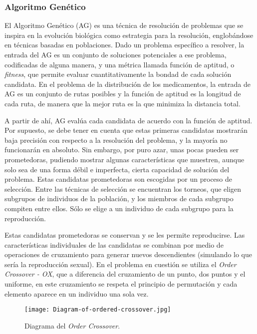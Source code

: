 \documentclass[twocolumn, fontsize=10pt]{article}
\theoremstyle{definition} %
\begin{document}
\subsubsection{Algoritmo Genético}

El Algoritmo Genético (AG) es una técnica de resolución de problemas que se inspira en la evolución biológica como estrategia para la resolución, englobándose en técnicas basadas en poblaciones. Dado un problema específico a resolver, la entrada del AG es un conjunto de soluciones potenciales a ese problema, codificadas de alguna manera, y una métrica llamada función de aptitud, o \textit{fitness}, que permite evaluar cuantitativamente la bondad de cada solución candidata. En el problema de la distribución de los medicamentos, la entrada de AG es un conjunto de rutas posibles y la función de aptitud es la longitud de cada ruta, de manera que la mejor ruta es la que minimiza la distancia total.  

A partir de ahí, AG evalúa cada candidata de acuerdo con la función de aptitud. Por supuesto, se debe tener en cuenta que estas primeras candidatas mostrarán baja precisión con respecto a la resolución del problema, y la mayoría no funcionarán en absoluto. Sin embargo, por puro azar, unas pocas pueden ser prometedoras, pudiendo mostrar algunas características que muestren, aunque solo sea de una forma débil e imperfecta, cierta capacidad de solución del problema. Estas candidatas prometedoras son escogidas por un proceso de selección. Entre las técnicas de selección se encuentran los torneos, que eligen subgrupos de individuos de la población, y los miembros de cada subgrupo compiten entre ellos. Sólo se elige a un individuo de cada subgrupo para la reproducción.  

Estas candidatas prometedoras se conservan y se les permite reproducirse. Las características individuales de las candidatas se combinan por medio de operaciones de cruzamiento para generar nuevos descendientes (simulando lo que sería la reproducción sexual). En el problema en cuestión se utiliza el \textit{Order Crossover - OX}, que a diferencia del cruzamiento de un punto, dos puntos y el uniforme, en este cruzamiento se respeta el principio de permutación y cada elemento aparece en un individuo una sola vez.

\begin{figure}[h]
    \centering
    \texttt{[image: Diagram-of-ordered-crossover.jpg]}
    \caption{Diagrama del \textit{Order Crossover}.}
    \label{fig:gadget}
\end{figure}
\end{document}
